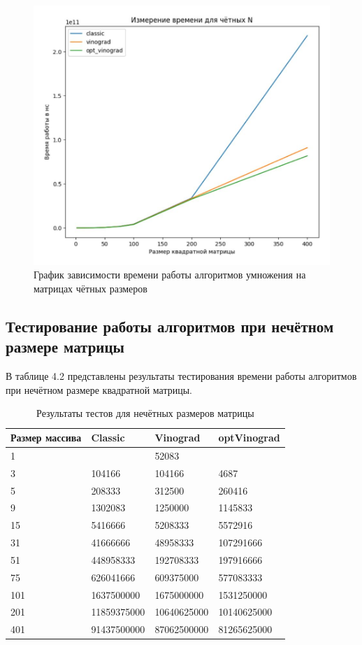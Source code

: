 \FloatBarrier
\begin{figure}[h]
	\begin{center}
		\includegraphics[width=\linewidth]{inc/chet.jpg}
	\end{center}
	\caption{График зависимости времени работы алгоритмов умножения на матрицах чётных размеров}
\end{figure}
\FloatBarrier

\subsection{Тестирование работы алгоритмов при нечётном размере матрицы}
В таблице 4.2 представлены результаты тестирования времени работы алгоритмов при нечётном размере
квадратной матрицы.

\FloatBarrier
\begin{table}[h]
	\caption{Результаты тестов для нечётных размеров матрицы}
	\centering
	\begin{tabular}{ | l | l | l | l |}
		\hline
		Размер массива & Classic & Vinograd & optVinograd \\ \hline
		1 & & 52083 & \\
		3 & 104166 & 104166 & 4687 \\
		5 & 208333 & 312500 & 260416 \\
		9 & 1302083 & 1250000 &  1145833 \\
		15 & 5416666 & 5208333 & 5572916 \\
		31 & 41666666 & 48958333 & 107291666 \\
		51 & 448958333 & 192708333 & 197916666 \\
		75 & 626041666 & 609375000 & 577083333 \\
		101 & 1637500000 & 1675000000 & 1531250000 \\
		201 & 11859375000 & 10640625000 & 10140625000 \\
		401 & 91437500000 & 87062500000 & 81265625000 \\
		\hline
	\end{tabular}
\end{table}
\FloatBarrier

